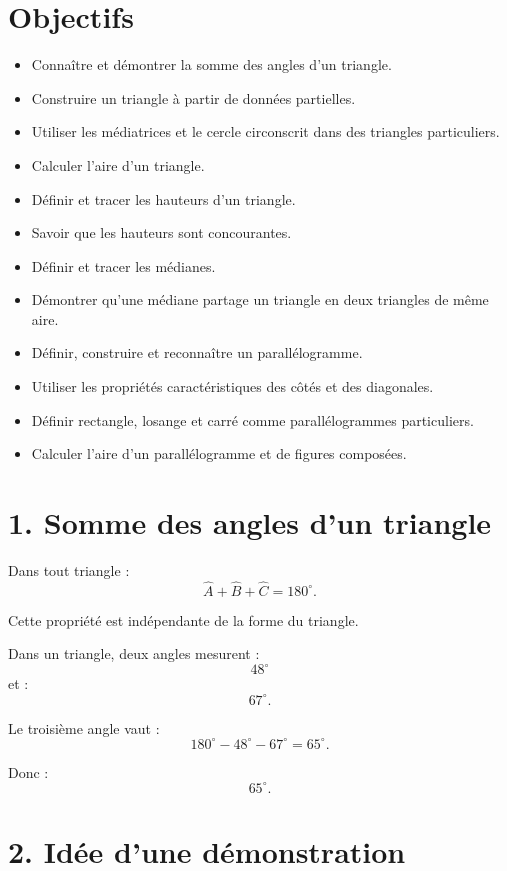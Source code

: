 
\section{Objectifs}

\begin{itemize}
\item Connaître et démontrer la somme des angles d'un triangle.
\item Construire un triangle à partir de données partielles.
\item Utiliser les médiatrices et le cercle circonscrit dans des triangles particuliers.
\item Calculer l'aire d'un triangle.
\item Définir et tracer les hauteurs d'un triangle.
\item Savoir que les hauteurs sont concourantes.
\item Définir et tracer les médianes.
\item Démontrer qu'une médiane partage un triangle en deux triangles de même aire.
\item Définir, construire et reconnaître un parallélogramme.
\item Utiliser les propriétés caractéristiques des côtés et des diagonales.
\item Définir rectangle, losange et carré comme parallélogrammes particuliers.
\item Calculer l'aire d'un parallélogramme et de figures composées.
\end{itemize}

\section{1. Somme des angles d'un triangle}

Dans tout triangle :
\[
\boxed{\widehat A+\widehat B+\widehat C=180^\circ}.
\]

Cette propriété est indépendante de la forme du triangle.

\begin{exemple}
Dans un triangle, deux angles mesurent :
\[
48^\circ
\]
et :
\[
67^\circ.
\]

Le troisième angle vaut :
\[
180^\circ-48^\circ-67^\circ=65^\circ.
\]

Donc :
\[
\boxed{65^\circ}.
\]
\end{exemple}

\section{2. Idée d'une démonstration}

